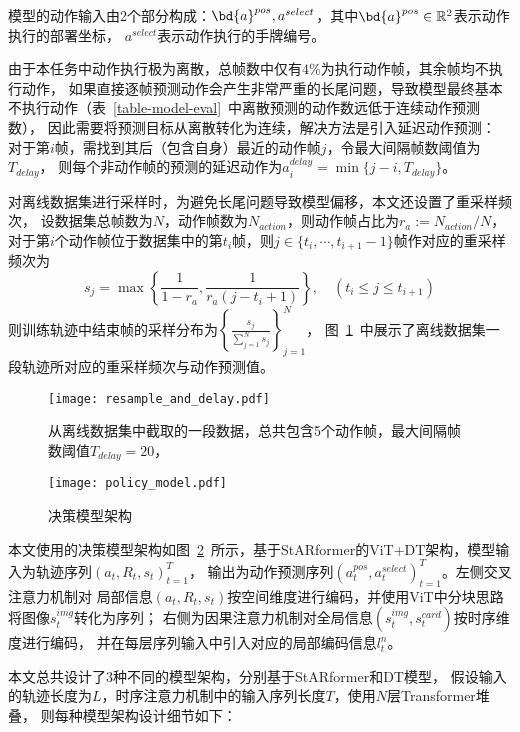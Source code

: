 模型的动作输入由2个部分构成：$\bd{a}^{pos}, a^{select}$，其中$\bd{a}^{pos}\in\mathbb{R}^2$表示动作执行的部署坐标，
$a^{select}$表示动作执行的手牌编号。

\label{sec-target}
由于本任务中动作执行极为离散，总帧数中仅有$4\%$为执行动作帧，其余帧均不执行动作，
如果直接逐帧预测动作会产生非常严重的长尾问题，导致模型最终基本不执行动作（表~\ref{table-model-eval}~中离散预测的动作数远低于连续动作预测数），
因此需要将预测目标从离散转化为连续，解决方法是引入延迟动作预测：
对于第$i$帧，需找到其后（包含自身）最近的动作帧$j$，令最大间隔帧数阈值为$T_{delay}$，
则每个非动作帧的预测的延迟动作为$a^{delay}_{i} = \min\{j-i, T_{delay}\}$。

对离线数据集进行采样时，为避免长尾问题导致模型偏移，本文还设置了重采样频次，
设数据集总帧数为$N$，动作帧数为$N_{action}$，则动作帧占比为$r_a:=N_{action} / N$，
对于第$i$个动作帧位于数据集中的第$t_i$帧，则$j\in\{t_{i},\cdots,t_{i+1}-1\}$帧作对应的重采样频次为
\begin{equation}\label{eq-resample-freq}
  s_j = \max\left\{\frac{1}{1-r_a}, \frac{1}{r_a(j-t_i+1)}\right\},\quad (t_i\leqslant j\leqslant t_{i+1})
\end{equation}
则训练轨迹中结束帧的采样分布为$\left\{\frac{s_j}{\sum_{j=1}^{N}s_j}\right\}_{j=1}^N$，
图~\ref{fig-resample-and-delay}~中展示了离线数据集一段轨迹所对应的重采样频次与动作预测值。
\begin{figure}[htbp]
  \centering
  \texttt{[image: resample\_and\_delay.pdf]}
  \caption{从离线数据集中截取的一段数据，总共包含5个动作帧，最大间隔帧数阈值$T_{delay} = 20$，}\label{fig-resample-and-delay}
\end{figure}

\label{sec-model-struct}
\begin{figure}[htbp]
  \centering
  \texttt{[image: policy\_model.pdf]}
  \caption{决策模型架构}
  \label{fig-model}
\end{figure}

本文使用的决策模型架构如图~\ref{fig-model}~所示，基于StARformer的ViT+DT架构，模型输入为轨迹序列$(a_t, R_t, s_t)_{t=1}^T$，
输出为动作预测序列$(a_t^{pos},a_t^{select})_{t=1}^T$。左侧交叉注意力机制对
局部信息$(a_t,R_t,s_t)$按空间维度进行编码，并使用ViT中分块思路将图像$s_t^{img}$转化为序列；
右侧为因果注意力机制对全局信息$(s^{img}_t,s^{card}_t)$按时序维度进行编码，
并在每层序列输入中引入对应的局部编码信息$l_t^{n}$。

本文总共设计了3种不同的模型架构，分别基于StARformer和DT模型，
假设输入的轨迹长度为$L$，时序注意力机制中的输入序列长度$T$，使用$N$层Transformer堆叠，
则每种模型架构设计细节如下：

